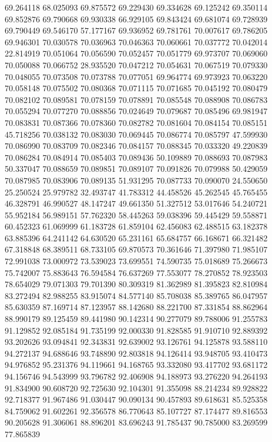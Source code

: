 69.264118
68.025093
69.875572
69.229430
69.334628
69.125242
69.350114
69.852876
69.790668
69.930338
66.929105
69.843424
69.681074
69.728939
69.790449
69.546170
57.177167
69.936952
69.781761
70.007617
69.786205
69.946301
70.030578
70.036963
70.046363
70.060661
70.037772
70.042014
22.814919
70.051064
70.056590
70.052457
70.051779
69.973707
70.069060
70.050088
70.066752
28.935520
70.047212
70.054631
70.067519
70.079330
70.048055
70.073508
70.073788
70.077051
69.964774
69.973923
70.063220
70.058148
70.075502
70.080368
70.071115
70.071685
70.045192
70.080479
70.082102
70.089581
70.078159
70.078891
70.085548
70.088908
70.086783
70.055294
70.077270
70.088856
70.024649
70.079687
70.085496
69.981947
70.083831
70.087366
70.078360
70.082782
70.081604
70.084154
70.085151
45.718256
70.038132
70.083030
70.069445
70.086774
70.085797
47.599930
70.086990
70.083709
70.082346
70.084157
70.088345
70.033320
49.220839
70.086284
70.084914
70.085403
70.089436
50.109889
70.088693
70.087983
50.337047
70.088659
70.089851
70.089107
70.091826
70.079988
50.429059
70.087985
70.083906
70.089135
51.931295
70.087733
70.090070
24.550650
25.250524
25.979782
32.493747
41.783312
44.458526
45.262545
45.765455
46.328791
46.990527
48.147247
49.661350
51.327512
53.017646
54.240721
55.952184
56.989151
57.762320
58.445263
59.038396
59.445429
59.558871
60.452323
61.069999
61.183728
61.859104
62.456083
62.488515
63.182378
63.885396
64.241142
64.630520
65.231161
65.684757
66.168671
66.321482
67.318848
68.389511
68.733105
69.870573
70.361646
71.397980
71.985107
72.991038
73.000972
73.539023
73.699551
74.590735
75.018689
75.266673
75.742007
75.883643
76.594584
76.637269
77.553077
78.270852
78.923503
78.654029
79.071303
79.701390
80.309319
81.362989
81.395823
82.810984
83.272494
82.988255
83.915074
84.577140
85.708038
85.389765
86.047957
85.630359
87.169714
87.123957
88.142680
88.221700
87.331854
88.862964
88.990179
89.125459
89.441980
90.142314
90.277079
89.788006
91.255783
91.129852
92.085184
91.735199
92.000330
91.828585
91.910710
92.889392
93.202626
93.094841
92.343831
92.639002
93.126761
94.125878
93.588110
94.272137
94.688646
93.748890
92.803818
94.126414
93.948705
93.410473
94.976852
95.231376
94.119661
94.168765
93.332080
93.417702
93.681172
94.156746
94.543999
93.796782
92.406908
94.188973
93.276220
94.264193
91.834900
90.608720
92.725630
92.104301
91.355098
88.214234
89.928822
92.718377
91.967486
91.030447
90.090134
90.457893
89.618631
85.525358
84.759062
91.602261
92.356578
86.770643
85.107727
87.174477
89.816553
90.205628
91.306061
88.896201
83.696243
91.785437
90.785000
83.269599
77.865839
